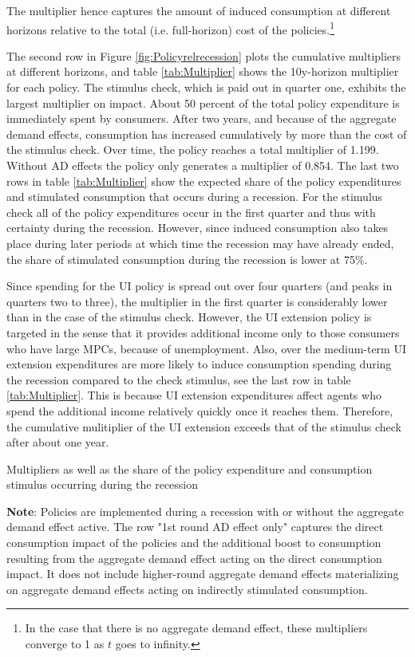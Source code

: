 The multiplier hence captures the amount of induced consumption at different horizons relative to the total (i.e.
full-horizon) cost of the policies.\footnote{In the case that there is no aggregate demand effect, these multipliers converge to 1 as $t$ goes to infinity.}


The second row in Figure \ref{fig:Policyrelrecession} plots the cumulative multipliers at different horizons, and table \ref{tab:Multiplier} shows the 10y-horizon multiplier for each policy.
The stimulus check, which is paid out in quarter one, exhibits the largest multiplier on impact.
About 50 percent of the total policy expenditure is immediately spent by consumers.
After two years, and because of the aggregate demand effects, consumption has increased cumulatively by more than the cost of the stimulus check.
Over time, the policy reaches a total multiplier of 1.199.
Without AD effects the policy only generates a multiplier of 0.854.
The last two rows in table \ref{tab:Multiplier} show the expected share of the policy expenditures and stimulated consumption that occurs during a recession.
For the stimulus check all of the policy expenditures occur in the first quarter and thus with certainty during the recession.
However, since induced consumption also takes place during later periods at which time the recession may have already ended, the share of stimulated consumption during the recession is lower at 75\%.

Since spending for the UI policy is spread out over four quarters (and peaks in quarters two to three), the multiplier in the first quarter is considerably lower than in the case of the stimulus check.
However, the UI extension policy is targeted in the sense that it provides additional income only to those consumers who have large MPCs, because of unemployment.
Also, over the medium-term UI extension expenditures are more likely to induce consumption spending during the recession compared to the check stimulus, see the last row in table \ref{tab:Multiplier}.
This is because UI extension expenditures affect agents who spend the additional income relatively quickly once it reaches them.
Therefore, the cumulative mulitiplier of the UI extension exceeds that of the stimulus check after about one year.


\begin{table}[t]
  \center
  
  \caption{Multipliers as well as the share of the policy expenditure and consumption stimulus occurring during the recession}
  \parbox{16cm}{\small \vspace{.15cm} \textbf{Note}: Policies are implemented during a recession with or without the aggregate demand effect active. The row "1st round AD effect only" captures the direct consumption impact of the policies and the additional boost to consumption resulting from the aggregate demand effect acting on the direct consumption impact. It does not include higher-round aggregate demand effects materializing on aggregate demand effects acting on indirectly stimulated consumption.\normalsize}
  \label{tab:Multiplier}
\end{table}

